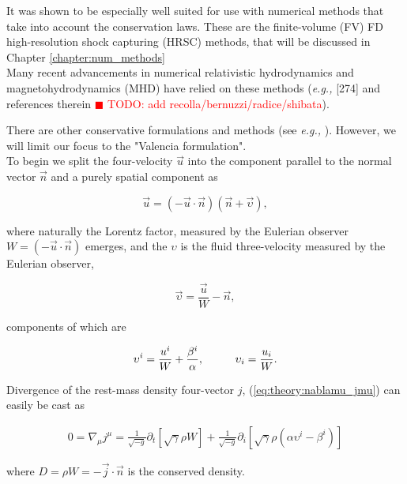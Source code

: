 \documentclass[11pt,a4paper,headinclude=true,DIV=14,BCOR=8mm,chapterprefix,listof=totoc,twoside,openright,abstracton]{scrbook}
\newcommand{\todo}[1]{\textcolor{red}{$\blacksquare$ TODO: #1}}
\begin{document}
It was shown to be especially well suited for use with numerical methods that take into account the conservation laws. These are the finite-volume (FV) FD high-resolution shock capturing (HRSC) methods, that will be discussed in Chapter \ref{chapter:num_methods} \\

Many recent advancements in numerical relativistic hydrodynamics and magnetohydrodynamics (MHD) have relied on these methods (\textit{e.g.,} \cite{Giacomazzo:2010bx} [274]\cite{Rezzolla:2011da} and references therein \todo{add recolla/bernuzzi/radice/shibata}).

There are other conservative formulations and methods (see \textit{e.g.,} \cite{Papadopoulos:1999kt}). However, we will limit our focus to the "Valencia formulation". \\

To begin we split the four-velocity $\vec{u}$ into the component parallel to the normal vector $\vec{n}$ and a purely spatial component as

\begin{equation}
    \vec{u} = (-\vec{u} \cdot \vec{n})(\vec{n} + \vec{\upsilon}),
\end{equation}

where naturally the Lorentz factor, measured by the Eulerian observer $W = (-\vec{u}\cdot\vec{n})$ emerges, and the $\upsilon$ is the fluid three-velocity measured by the Eulerian observer, 

\begin{equation}
    \vec{\upsilon} = \frac{\vec{u}}{W} -\vec{n},
\end{equation}

components of which are

\begin{equation}
    \upsilon^i = \frac{u^i}{W}+ \frac{\beta^i}{\alpha}, \hspace{10mm} \upsilon_i= \frac{u_{i}}{W}.
\end{equation}

Divergence of the rest-mass density four-vector $j$, (\ref{eq:theory:nablamu_jmu}) can easily be cast as 

\begin{eqnarray}
    0 = \nabla_{\mu}j^{\mu} = \frac{1}{\sqrt{-g}}\partial_{t}[\sqrt{\gamma}\rho W] + \frac{1}{\sqrt{-g}}\partial_{i}[\sqrt{\gamma}\rho(\alpha \upsilon^{i} - \beta^{i})]
\end{eqnarray}

where $D=\rho W = -\vec{j}\cdot \vec{n}$ is the conserved density.
\end{document}
